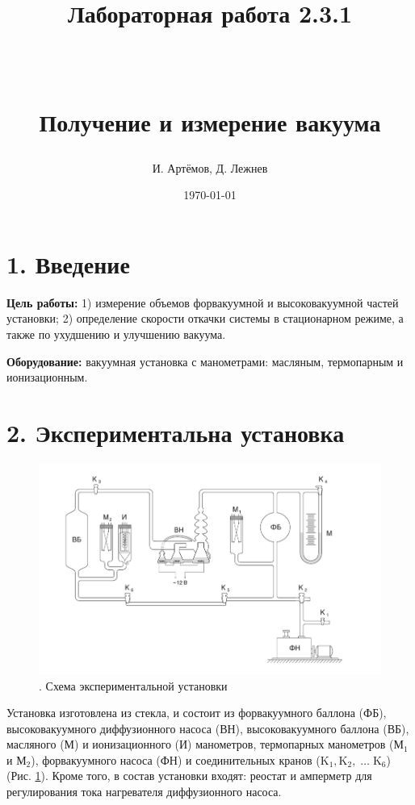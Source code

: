 \documentclass[a4paper]{article}
\begin{document}
\title{\textbf{Лабораторная работа 2.3.1}

\

Получение и измерение вакуума

}
\author{И. Артёмов, Д. Лежнев}
\date{\today}
\maketitle
\noindent

\section*{1. Введение}
	\noindent\textbf{Цель работы:} 1) измерение объемов форвакуумной и высоковакуумной частей установки; 2) определение скорости откачки системы в стационарном режиме, а также по ухудшению и улучшению вакуума.
	
\noindent\textbf{Оборудование:} вакуумная установка с манометрами: масляным, термопарным и ионизационным.
	
\section*{2. Экспериментальна установка}
	
\begin{figure}[h!]
	\centering
	\includegraphics[scale=0.53]{facility.jpg}
	\caption{. Схема экспериментальной установки}
	\label{facility}
\end{figure}

Установка изготовлена из стекла, и состоит из форвакуумного баллона (ФБ), высоковакуумного диффузионного насоса (ВН), высоковакуумного баллона (ВБ), масляного (М) и ионизационного (И) манометров, термопарных манометров ($\text{М}_1$ и $\text{М}_2$), форвакуумного насоса (ФН) и соединительных кранов ($\text{K}_1, \text{K}_2,\; \ldots \;\text{K}_6$) (Рис. \ref{facility}). Кроме того, в состав установки входят: реостат и амперметр для регулирования тока нагревателя диффузионного насоса.
	
\end{document}
